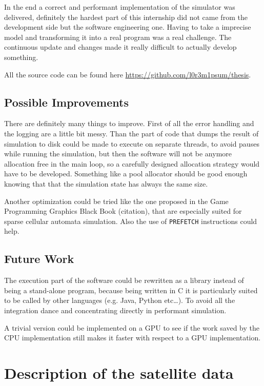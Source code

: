 \documentclass[Lau]{sapthesis} %
\let\oldsection\section
\def\subsection{\oldsection}
\def\section{\chapter}
\begin{document}
In the end a correct and performant implementation of the simulator was
delivered, definitely the hardest part of this internship did not came from the
development side but the software engineering one. Having to take a imprecise
model and transforming it into a real program was a real challenge. The
continuous update and changes made it really difficult to actually develop
something.

All the source code can be found here
\url{https://github.com/l0r3m1psum/thesis}.

\subsection{Possible Improvements}

There are definitely many things to improve. First of all the error handling and
the logging are a little bit messy. Than the part of code that dumps the result
of simulation to disk could be made to execute on separate threads, to avoid
pauses while running the simulation, but then the software will not be anymore
allocation free in the main loop, so a carefully designed allocation strategy
would have to be developed. Something like a pool allocator should be good
enough knowing that that the simulation state has always the same size.

Another optimization could be tried like the one proposed in the Game
Programming Graphics Black Book (citation), that are especially suited for
sparse cellular automata simulation. Also the use of \texttt{PREFETCH}
instructions could help.

\subsection{Future Work}

The execution part of the software could be rewritten as a library instead of
being a stand-alone program, because being written in C it is particularly
suited to be called by other languages (e.g. Java, Python etc\dots). To avoid
all the integration dance and concentrating directly in performant simulation.

A trivial version could be implemented on a GPU to see if the work saved by the
CPU implementation still makes it faster with respect to a GPU implementation.

\appendix

\section{Description of the satellite data}\label{sec:desc}
\end{document}
